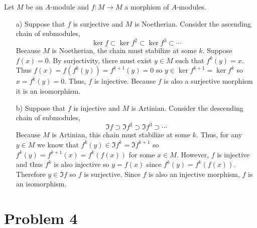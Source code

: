 \documentclass[12pt]{extarticle}
\begin{document}
Let $M$ be an $A$-module and $f : M \to M$ a morphism of $A$-modules.
\begin{enumerate}
\item[a)] Suppose that $f$ is surjective and $M$ is Noetherian. Consider the ascending chain of submodules,
\[ \ker{f} \subset \ker{f^2} \subset \ker{f^3} \subset \cdots \]
Because $M$ is Noetherian, the chain must stabilize at some $k$. Suppose $f(x) = 0$. By surjectivity, there must exist $y \in M$ such that $f^k(y) = x$. Thus $f(x) = f(f^k(y)) = f^{k+1}(y) = 0$ so $y \in \ker{f^{k+1}} = \ker{f^k}$ so $x =f^k(y) = 0$. Thus, $f$ is injective. Because $f$ is also a surjective morphism it is an isomorphism.

\item[b)] Suppose that $f$ is injective and $M$ is Artinian. Consider the descending chain of submodules,
\[ \Im{f} \supset \Im{f^2} \supset \Im{f^3} \supset \cdots \]
Because $M$ is Artinian, this chain must stabilize at some $k$. Thus, for any $y \in M$ we know that $f^{k}(y) \in \Im{f^{k}} = \Im{f^{k+1}}$ so $f^{k}(y) = f^{k+1}(x) = f^k(f(x))$ for some $x \in M$. However, $f$ is injective and thus $f^k$ is also injective so $y = f(x)$ since $f^k(y) = f^k(f(x))$. Therefore $y \in \Im{f}$ so $f$ is surjective. Since $f$ is also an injective morphism, $f$ is an isomorphism.    
\end{enumerate}

\section{Problem 4}
\end{document}
